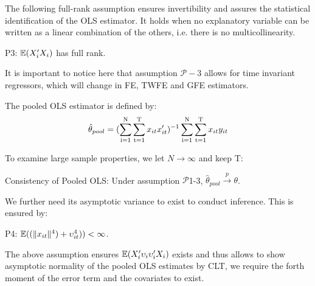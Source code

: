 The following full-rank assumption ensures invertibility and assures the statistical identification of the OLS estimator. It holds when no explanatory variable can be written as a linear combination of the others, i.e. there is no multicollinearity. 
\begin{assumption}
P3:  $\operatorname{\mathbb{E}}(X_i'X_i)$ has full rank.
\end{assumption} 

It is important to notice here that assumption $\mathcal{P}-3$  allows for time invariant regressors, which will change in FE, TWFE and GFE estimators.

The pooled OLS estimator is defined by:
\begin{align} \label{{eqn:pols}}
    \hat\theta_{pool} = (\sumi\sumt x_{it}x_{it}')^{-1}\sumi\sumt x_{it}y_{it}
\end{align}

To examine large sample properties, we let $N \to \infty$ and keep T:
\begin{theorem} 
Consistency of Pooled OLS: Under assumption $\mathcal{P}$1-3, $\hat\theta_{pool}  \overset{p}{\to} \theta$. 
\end{theorem}

We further need its asymptotic variance to exist to conduct inference. This is ensured by:

\begin{assumption}
P4:  $\operatorname{\mathbb{E}}((\lVert  x_{it} \rVert^4) + \upsilon_{it}^4)) < \infty $.
\end{assumption} 

The above assumption ensures $\operatorname{\mathbb{E}}(X_i'\upsilon_i\upsilon_i'X_i)$ exists and thus allows to show asymptotic normality of the pooled OLS estimates by CLT, we require the forth moment of the error term and the covariates to exist.

